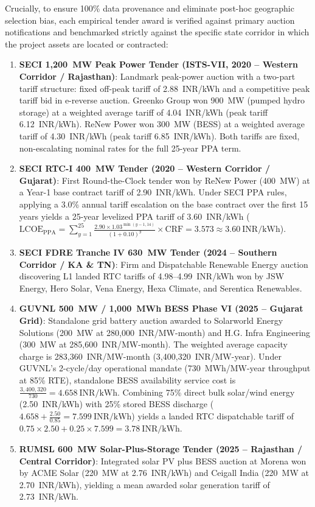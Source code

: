 \documentclass[11pt,a4paper]{article}
\begin{document}
Crucially, to ensure 100\% data provenance and eliminate post-hoc geographic selection bias, each empirical tender award is verified against primary auction notifications and benchmarked strictly against the specific state corridor in which the project assets are located or contracted:
\begin{enumerate}
    \item \textbf{SECI 1,200~MW Peak Power Tender (ISTS-VII, 2020 -- Western Corridor / Rajasthan)}: Landmark peak-power auction with a two-part tariff structure: fixed off-peak tariff of 2.88~INR/kWh and a competitive peak tariff bid in e-reverse auction. Greenko Group won 900~MW (pumped hydro storage) at a weighted average tariff of 4.04~INR/kWh (peak tariff 6.12~INR/kWh). ReNew Power won 300~MW (BESS) at a weighted average tariff of 4.30~INR/kWh (peak tariff 6.85~INR/kWh). Both tariffs are fixed, non-escalating nominal rates for the full 25-year PPA term.
    
    \item \textbf{SECI RTC-I 400~MW Tender (2020 -- Western Corridor / Gujarat)}: First Round-the-Clock tender won by ReNew Power (400~MW) at a Year-1 base contract tariff of 2.90~INR/kWh. Under SECI PPA rules, applying a 3.0\% annual tariff escalation on the base contract over the first 15 years yields a 25-year levelized PPA tariff of 3.60~INR/kWh ($\text{LCOE}_{\text{PPA}} = \sum_{y=1}^{25} \frac{2.90 \times 1.03^{\min(y-1,14)}}{(1+0.10)^y} \times \text{CRF} = 3.573 \approx 3.60~\text{INR/kWh}$).
    
    \item \textbf{SECI FDRE Tranche IV 630~MW Tender (2024 -- Southern Corridor / KA \& TN)}: Firm and Dispatchable Renewable Energy auction discovering L1 landed RTC tariffs of 4.98--4.99~INR/kWh won by JSW Energy, Hero Solar, Vena Energy, Hexa Climate, and Serentica Renewables.
    
    \item \textbf{GUVNL 500~MW / 1,000~MWh BESS Phase VI (2025 -- Gujarat Grid)}: Standalone grid battery auction awarded to Solarworld Energy Solutions (200~MW at 280,000~INR/MW-month) and H.G. Infra Engineering (300~MW at 285,600~INR/MW-month). The weighted average capacity charge is 283,360~INR/MW-month (3,400,320~INR/MW-year). Under GUVNL's 2-cycle/day operational mandate (730~MWh/MW-year throughput at 85\% RTE), standalone BESS availability service cost is $\frac{3,400,320}{730} = 4.658~\text{INR/kWh}$. Combining 75\% direct bulk solar/wind energy (2.50~INR/kWh) with 25\% stored BESS discharge ($4.658 + \frac{2.50}{0.85} = 7.599~\text{INR/kWh}$) yields a landed RTC dispatchable tariff of $0.75 \times 2.50 + 0.25 \times 7.599 = 3.78~\text{INR/kWh}$.
    
    \item \textbf{RUMSL 600~MW Solar-Plus-Storage Tender (2025 -- Rajasthan / Central Corridor)}: Integrated solar PV plus BESS auction at Morena won by ACME Solar (220~MW at 2.76~INR/kWh) and Ceigall India (220~MW at 2.70~INR/kWh), yielding a mean awarded solar generation tariff of 2.73~INR/kWh.
\end{enumerate}
\end{document}
